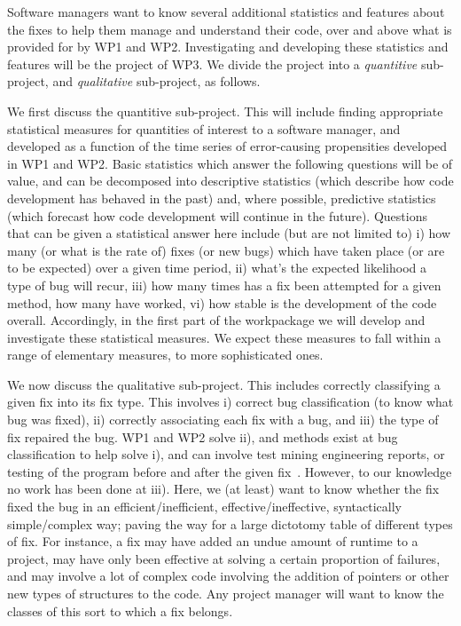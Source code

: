 Software managers want to know several additional statistics and features about the fixes to help them manage and understand their code, over and above what is provided for by WP1 and WP2. Investigating and developing these statistics and features will be the project of WP3. We divide the project into a \textit{quantitive} sub-project, and \textit{qualitative} sub-project, as follows.

We first discuss the quantitive sub-project. This will include finding appropriate statistical measures for quantities of interest to a software manager, and developed as a function of the time series of error-causing propensities developed in WP1 and WP2. Basic statistics which answer the following questions will be of value, and can be decomposed into descriptive statistics (which describe how code development has behaved in the past) and, where possible, predictive statistics (which forecast how code development will continue in the future). Questions that can be given a statistical answer here include (but are not limited to) i) how many (or what is the rate of) fixes (or new bugs) which have taken place (or are to be expected) over a given time period, ii) what's the expected likelihood a type of bug will recur, iii) how many times has a fix been attempted for a given method, how many have worked, vi) how stable is the development of the code overall. Accordingly, in the first part of the workpackage we will develop and investigate these statistical measures. We expect these measures to fall within a range of elementary measures, to more sophisticated ones.  

We now discuss the qualitative sub-project. 
This includes correctly classifying a given fix into its fix type. This involves i) correct bug classification (to know what bug was fixed), ii) correctly associating each fix with a bug, and iii) the type of fix repaired the bug.
WP1 and WP2 solve ii), and methods exist at bug classification to help solve i), and can involve test mining engineering reports, or testing of the program before and after the given fix~\cite{6245635}. However, to our knowledge no work has been done at iii). Here, we (at least) want to know whether the fix fixed the bug in an efficient/inefficient, effective/ineffective, syntactically simple/complex way; paving the way for a large dictotomy table of different types of fix. For instance, a fix may have added an undue amount of runtime to a project, may have only been effective at solving a certain proportion of failures, and may involve a lot of complex code involving the addition of pointers or other new types of structures to the code. Any project manager will want to know the classes of this sort to which a fix belongs.  

